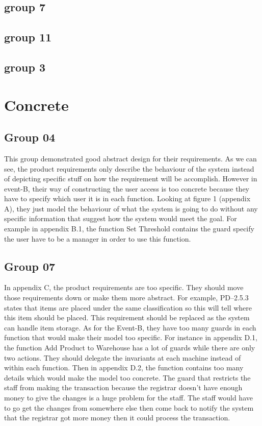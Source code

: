 \subsection{group 7}
\label{group7}

\subsection{group 11}
\label{group11}

\subsection{group 3}
\label{group3}

\section{Concrete}
\label{concrete}

\subsection{Group 04}
\label{group04}

This group demonstrated good abstract design for their requirements. As we can see, the product requirements only describe the behaviour of the system instead of depicting specific stuff on how the requirement will be accomplish. However in event-B, their way of constructing the user access is too concrete because they have to specify which user it is in each function. Looking at figure 1 (appendix A), they just model the behaviour of what the system is going to do without any specific information that suggest how the system would meet the goal. For example in appendix B.1, the function Set Threshold contains the guard specify the user have to be a manager in order to use this function. 

\subsection{Group 07}
\label{group07}

In appendix C, the product requirements are too specific. They should move those requirements down or make them more abstract. For example, PD--2.5.3 states that items are placed under the same classification so this will tell where this item should be placed. This requirement should be replaced as the system can handle item storage. As for the Event-B, they have too many guards in each function that would make their model too specific. For instance in appendix D.1, the function Add Product to Warehouse has a lot of guards while there are only two actions. They should delegate the invariants at each machine instead of within each function. Then in appendix D.2, the function contains too many details which would make the model too concrete. The guard that restricts the staff from making the transaction because the registrar doesn’t have enough money to give the changes is a huge problem for the staff. The staff would have to go get the changes from somewhere else then come back to notify the system that the registrar got more money then it could process the transaction.

